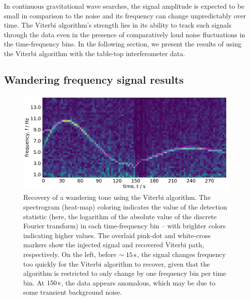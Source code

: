 \documentclass[paper-main.tex]{subfiles}
\begin{document}
In continuous gravitational wave searches, the signal amplitude is expected to be small in comparison to the noise and its frequency can change unpredictably over time. %
The Viterbi algorithm's strength lies in its ability to track such signals through the data even in the presence of comparatively loud noise fluctuations in the time-frequency bins.
In the following section, we present the results of using the Viterbi algorithm with the table-top interferometer data. 







\subsection{Wandering frequency signal results}
\label{sec:wanderingResults}

\begin{figure}
	\includegraphics[width=\textwidth]{figures/expt_overlay_2_viterbi_test_webcam.pdf}
	\caption{\label{fig:viterbi_overlay}
Recovery of a wandering tone using the Viterbi algorithm.
The spectrogram (heat-map) coloring indicates the value of the detection statistic (here, the logarithm of the absolute value of the discrete Fourier transform) in each time-frequency bin -- with brighter colors indicating higher values. 
The overlaid pink-dot and white-cross markers show the injected signal and recovered Viterbi path, respectively. 
On the left, before $\sim 15\,{\rm s}$, the signal changes frequency too quickly for the Viterbi algorithm to recover, given that the algorithm is restricted to only change by one frequency bin per time bin. 
At $150\,{\rm s}$, the data appears anomalous, which may be due to some transient background noise. }
\end{figure}
 
\end{document}
